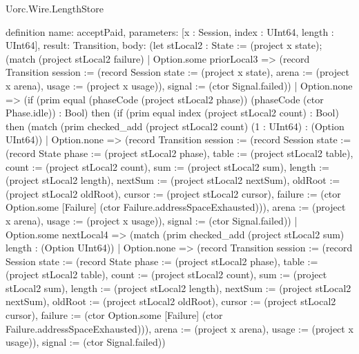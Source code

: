 \begin{lexlean}{Uorc.Wire.LengthStore}
\begin{semanticmodule}
definition{
  name: acceptPaid,
  parameters: [x : Session, index : UInt64, length : UInt64],
  result: Transition,
  body: (let stLocal2 : State := (project x state); (match (project stLocal2 failure)
    | Option.some priorLocal3 => (record Transition {session := (record Session {state := (project x state), arena := (project x arena), usage := (project x usage)}), signal := (ctor Signal.failed)})
    | Option.none => (if (prim equal (phaseCode (project stLocal2 phase)) (phaseCode (ctor Phase.idle)) : Bool) then (if (prim equal index (project stLocal2 count) : Bool) then (match (prim checked_add (project stLocal2 count) (1 : UInt64) : (Option UInt64))
      | Option.none => (record Transition {session := (record Session {state := (record State {phase := (project stLocal2 phase), table := (project stLocal2 table), count := (project stLocal2 count), sum := (project stLocal2 sum), length := (project stLocal2 length), nextSum := (project stLocal2 nextSum), oldRoot := (project stLocal2 oldRoot), cursor := (project stLocal2 cursor), failure := (ctor Option.some [Failure] (ctor Failure.addressSpaceExhausted))}), arena := (project x arena), usage := (project x usage)}), signal := (ctor Signal.failed)})
      | Option.some nextLocal4 => (match (prim checked_add (project stLocal2 sum) length : (Option UInt64))
        | Option.none => (record Transition {session := (record Session {state := (record State {phase := (project stLocal2 phase), table := (project stLocal2 table), count := (project stLocal2 count), sum := (project stLocal2 sum), length := (project stLocal2 length), nextSum := (project stLocal2 nextSum), oldRoot := (project stLocal2 oldRoot), cursor := (project stLocal2 cursor), failure := (ctor Option.some [Failure] (ctor Failure.addressSpaceExhausted))}), arena := (project x arena), usage := (project x usage)}), signal := (ctor Signal.failed)})
}
\end{semanticmodule}
\end{lexlean}
